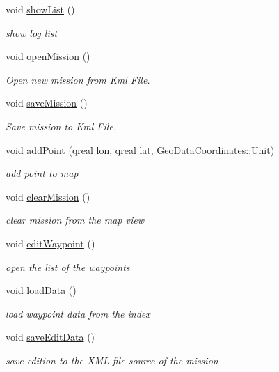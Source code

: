 \begin{DoxyCompactItemize}
void \hyperlink{class_m_a_r_c_s_a778d9966beede499bbfcfa853386f199}{show\-List} ()
\begin{DoxyCompactList}\small\item\em show log list \end{DoxyCompactList}\item 
void \hyperlink{class_m_a_r_c_s_addec77eddadd8c18f8c1871e62663b5e}{open\-Mission} ()
\begin{DoxyCompactList}\small\item\em Open new mission from Kml File. \end{DoxyCompactList}\item 
void \hyperlink{class_m_a_r_c_s_a6f65f99d0e1c30d9c8fb6ba9a81b442b}{save\-Mission} ()
\begin{DoxyCompactList}\small\item\em Save mission to Kml File. \end{DoxyCompactList}\item 
void \hyperlink{class_m_a_r_c_s_a9fc0756327efaf7e90a8cb954aca31b0}{add\-Point} (qreal lon, qreal lat, Geo\-Data\-Coordinates\-::\-Unit)
\begin{DoxyCompactList}\small\item\em add point to map \end{DoxyCompactList}\item 
void \hyperlink{class_m_a_r_c_s_a708c8328479fbd7dd2f11ddcfb8c60ff}{clear\-Mission} ()
\begin{DoxyCompactList}\small\item\em clear mission from the map view \end{DoxyCompactList}\item 
void \hyperlink{class_m_a_r_c_s_af52bf6ef85125711e254582b70109b32}{edit\-Waypoint} ()
\begin{DoxyCompactList}\small\item\em open the list of the waypoints \end{DoxyCompactList}\item 
void \hyperlink{class_m_a_r_c_s_a139c3d3678a014e85bda779d7e391185}{load\-Data} ()
\begin{DoxyCompactList}\small\item\em load waypoint data from the index \end{DoxyCompactList}\item 
void \hyperlink{class_m_a_r_c_s_a780646767f3aafe425f1552ea7ab31df}{save\-Edit\-Data} ()
\begin{DoxyCompactList}\small\item\em save edition to the X\-M\-L file source of the mission \end{DoxyCompactList}\item 

\end{DoxyCompactItemize}
